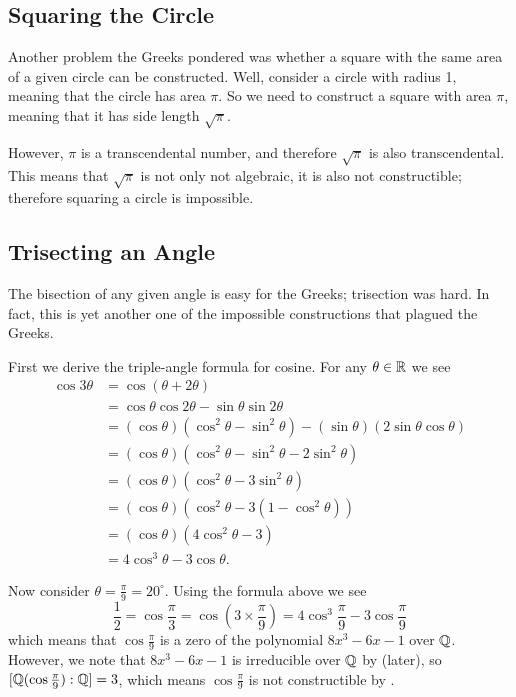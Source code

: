 \subsection{Squaring the Circle}
Another problem the Greeks pondered was whether a square with the same area of a given circle can be constructed. Well, consider a circle with radius 1, meaning that the circle has area $\pi$. So we need to construct a square with area $\pi$, meaning that it has side length $\sqrt\pi$.

However, $\pi$ is a transcendental number, and therefore $\sqrt\pi$ is also transcendental. This means that $\sqrt\pi$ is not only not algebraic, it is also not constructible; therefore squaring a circle is impossible.

\subsection{Trisecting an Angle}
The bisection of any given angle is easy for the Greeks; trisection was hard. In fact, this is yet another one of the impossible constructions that plagued the Greeks.

First we derive the triple-angle formula for cosine. For any $\theta \in \mathbb{R}$ we see
\begin{align*}
    \cos3\theta &= \cos(\theta + 2\theta)\\
    &= \cos\theta\cos2\theta - \sin\theta\sin2\theta\\
    &= (\cos\theta)(\cos^2\theta-\sin^2\theta) - (\sin\theta)(2\sin\theta\cos\theta)\\
    &= (\cos\theta)(\cos^2\theta - \sin^2\theta - 2\sin^2\theta)\\
    &= (\cos\theta)(\cos^2\theta - 3\sin^2\theta)\\
    &= (\cos\theta)(\cos^2\theta - 3(1-\cos^2\theta))\\
    &= (\cos\theta)(4\cos^2\theta - 3)\\
    &= 4\cos^3\theta - 3\cos\theta.
\end{align*}

Now consider $\theta = \frac{\pi}{9} = 20^\circ$. Using the formula above we see
\[
    \frac12 = \cos\frac\pi3 = \cos\left(3\times\frac\pi9\right) = 4\cos^3\frac\pi9 - 3\cos\frac\pi9
\]
which means that $\cos\frac\pi9$ is a zero of the polynomial $8x^3 - 6x - 1$ over $\mathbb{Q}$. However, we note that $8x^3 - 6x - 1$ is irreducible over $\mathbb{Q}$ by  (later), so $[\mathbb{Q}(\cos\frac\pi9): \mathbb{Q}] = 3$, which means $\cos\frac\pi9$ is not constructible by .

